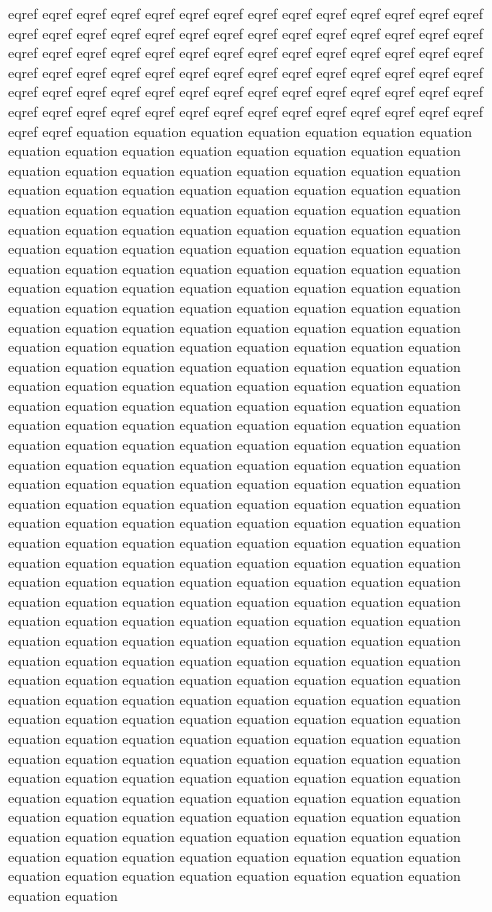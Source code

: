 eqref eqref eqref eqref eqref eqref eqref eqref eqref eqref eqref eqref eqref eqref eqref eqref eqref eqref eqref eqref eqref eqref eqref eqref eqref eqref eqref eqref eqref eqref eqref eqref eqref eqref eqref eqref eqref eqref eqref eqref eqref eqref eqref eqref eqref eqref eqref eqref eqref eqref eqref eqref eqref eqref eqref eqref eqref eqref eqref eqref eqref eqref eqref eqref eqref eqref eqref eqref eqref eqref eqref eqref eqref eqref eqref eqref eqref eqref eqref eqref eqref eqref eqref eqref eqref eqref equation equation equation equation equation equation equation equation equation equation equation equation equation equation equation equation equation equation equation equation equation equation equation equation equation equation equation equation equation equation equation equation equation equation equation equation equation equation equation equation equation equation equation equation equation equation equation equation equation equation equation equation equation equation equation equation equation equation equation equation equation equation equation equation equation equation equation equation equation equation equation equation equation equation equation equation equation equation equation equation equation equation equation equation equation equation equation equation equation equation equation equation equation equation equation equation equation equation equation equation equation equation equation equation equation equation equation equation equation equation equation equation equation equation equation equation equation equation equation equation equation equation equation equation equation equation equation equation equation equation equation equation equation equation equation equation equation equation equation equation equation equation equation equation equation equation equation equation equation equation equation equation equation equation equation equation equation equation equation equation equation equation equation equation equation equation equation equation equation equation equation equation equation equation equation equation equation equation equation equation equation equation equation equation equation equation equation equation equation equation equation equation equation equation equation equation equation equation equation equation equation equation equation equation equation equation equation equation equation equation equation equation equation equation equation equation equation equation equation equation equation equation equation equation equation equation equation equation equation equation equation equation equation equation equation equation equation equation equation equation equation equation equation equation equation equation equation equation equation equation equation equation equation equation equation equation equation equation equation equation equation equation equation equation equation equation equation equation equation equation equation equation equation equation equation equation equation equation equation equation equation equation equation equation equation equation equation equation equation equation equation equation equation equation equation equation equation equation equation equation equation equation equation equation equation equation equation equation equation equation equation equation equation 